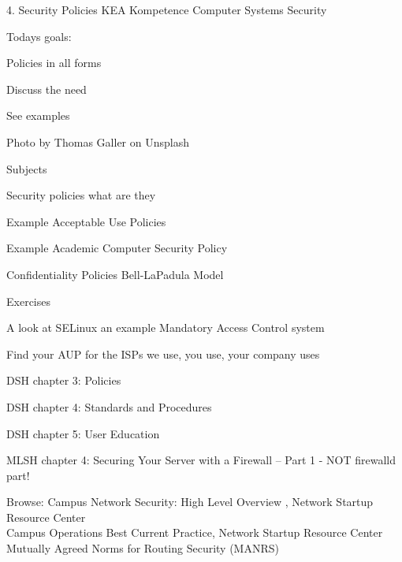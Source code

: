\documentclass[Screen16to9,17pt]{foils}
\begin{document}
\mytitlepage
{4. Security Policies}
{KEA Kompetence Computer Systems Security \the\year}



Todays goals:
\begin{list2}
\item Policies in all forms
\item Discuss the need
\item See examples
\end{list2}

  Photo by Thomas Galler on Unsplash


\begin{list1}
\item Subjects
\begin{list2}
\item Security policies what are they
  \item Example Acceptable Use Policies
  \item Example Academic Computer Security Policy
  \item Confidentiality Policies Bell-LaPadula Model
\end{list2}
\item Exercises
\begin{list2}
\item A look at SELinux an example Mandatory Access Control system
\item Find your AUP for the ISPs we use, you use, your company uses
\end{list2}
\end{list1}


\begin{list1}
\item DSH chapter 3: Policies
\item DSH chapter 4: Standards and Procedures
\item DSH chapter 5: User Education
\item MLSH chapter 4: Securing Your Server with a
Firewall – Part 1 - NOT firewalld part!

\item Browse: Campus Network Security: High Level Overview , Network Startup Resource Center\\
Campus Operations Best Current Practice, Network Startup Resource Center\\
Mutually Agreed Norms for Routing Security (MANRS)
\end{list1}
\end{document}
